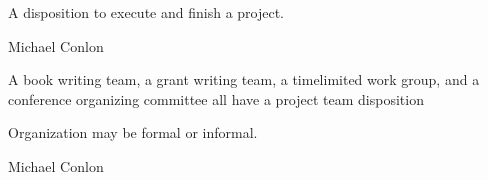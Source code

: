 \documentclass[letterpaper,10pt,english]{sphinxmanual}
\begin{document}
\begin{sphinxShadowBox}

\sphinxAtStartPar
{\hyperref[\detokenize{doc-BFO_0000016::doc}]{}}
\end{sphinxShadowBox}

\begin{sphinxShadowBox}

\sphinxAtStartPar
A disposition to execute and finish a project.
\end{sphinxShadowBox}

\begin{sphinxShadowBox}

\sphinxAtStartPar
Michael Conlon 
\end{sphinxShadowBox}

\begin{sphinxShadowBox}

\sphinxAtStartPar
A book writing team, a grant writing team, a time\sphinxhyphen{}limited work group, and a conference organizing committee all have a project team disposition
\end{sphinxShadowBox}

\begin{sphinxShadowBox}

\sphinxAtStartPar
Organization may be formal or informal.
\end{sphinxShadowBox}

\begin{sphinxShadowBox}

\sphinxAtStartPar
{}
\end{sphinxShadowBox}

\begin{sphinxShadowBox}

\sphinxAtStartPar
Michael Conlon 
\end{sphinxShadowBox}
\begin{quote}

\ignorespaces \end{quote}
\end{document}
